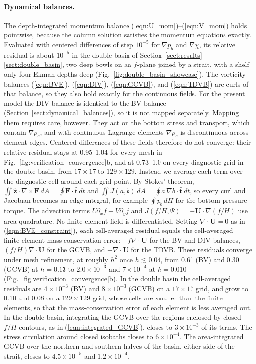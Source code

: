 \documentclass{ametsocV6.2}
\begin{document}
\paragraph{Dynamical balances.}
The depth-integrated momentum balance (\ref{eqn:U_mom})--(\ref{eqn:V_mom}) holds pointwise, because the column solution satisfies the momentum equations exactly.
Evaluated with centered differences of step $10^{-5}$ for $\nabla p_b$ and $\nabla \chi$, its relative residual is about $10^{-5}$ in the double basin of Section~\ref{sect:results}\ref{sect:double_basin}, two deep bowls on an $f$-plane joined by a strait, with a shelf only four Ekman depths deep (Fig.~\ref{fig:double_basin_showcase}).
The vorticity balances (\ref{eqn:BVE}), (\ref{eqn:DIV}), (\ref{eqn:GCVB}), and (\ref{eqn:TDVB}) are curls of that balance, so they also hold exactly for the continuous fields. For the present model the DIV balance is identical to the BV balance (Section~\ref{sect:dynamical_balances}), so it is not mapped separately.
Mapping them requires care, however.
They act on the bottom stress and transport, which contain $\nabla p_s$, and with continuous Lagrange elements $\nabla p_s$ is discontinuous across element edges.
Centered differences of these fields therefore do not converge: their relative residual stays at 0.95--1.04 for every mesh in Fig.~\ref{fig:verification_convergence}b, and at 0.73--1.0 on every diagnostic grid in the double basin, from $17 \times 17$ to $129 \times 129$.
Instead we average each term over the diagnostic cell around each grid point.
By Stokes' theorem, $\iint \hat{\mathbf{z}} \cdot \nabla \times \mathbf{F} \, dA = \oint \mathbf{F} \cdot \hat{\mathbf{t}} \, dt$ and $\iint J(a,b) \, dA = \oint a \, \nabla b \cdot \hat{\mathbf{t}} \, dt$, so every curl and Jacobian becomes an edge integral, for example $\oint p_b \, dH$ for the bottom-pressure torque.
The advection terms $U \partial_x f + V \partial_y f$ and $J(f/H, \Psi) = -\mathbf{U} \cdot \nabla (f/H)$ use area quadrature.
No finite-element field is differentiated.
Setting $\nabla \cdot \mathbf{U} = 0$ as in (\ref{eqn:BVE_constraint}), each cell-averaged residual equals the cell-averaged finite-element mass-conservation error: $-f \nabla \cdot \mathbf{U}$ for the BV and DIV balances, $(f/H) \nabla \cdot \mathbf{U}$ for the GCVB, and $-\nabla \cdot \mathbf{U}$ for the TDVB.
These residuals converge under mesh refinement, at roughly $h^2$ once $h \lesssim 0.04$, from 0.61 (BV) and 0.30 (GCVB) at $h = 0.13$ to $2.0 \times 10^{-3}$ and $7 \times 10^{-4}$ at $h = 0.010$ (Fig.~\ref{fig:verification_convergence}b).
In the double basin the cell-averaged residuals are $4 \times 10^{-3}$ (BV) and $8 \times 10^{-3}$ (GCVB) on a $17 \times 17$ grid, and grow to 0.10 and 0.08 on a $129 \times 129$ grid, whose cells are smaller than the finite elements, so that the mass-conservation error of each element is less averaged out.
In the double basin, integrating the GCVB over the regions enclosed by closed $f/H$ contours, as in (\ref{eqn:integrated_GCVB}), closes to $3 \times 10^{-3}$ of its terms.
The stress circulation around closed isobaths closes to $6 \times 10^{-4}$.
The area-integrated GCVB over the northern and southern halves of the basin, either side of the strait, closes to $4.5 \times 10^{-5}$ and $1.2 \times 10^{-4}$.
\end{document}
